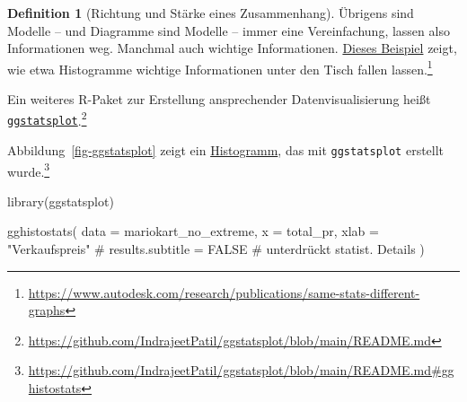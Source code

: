 \documentclass[
  a4paper,
  DIV=11]{scrreprt}
\newenvironment{Shaded}{\begin{snugshade}}{\end{snugshade}}
\newcommand{\AttributeTok}[1]{\textcolor[rgb]{0.40,0.45,0.13}{#1}}
\newcommand{\CommentTok}[1]{\textcolor[rgb]{0.37,0.37,0.37}{#1}}
\newcommand{\FunctionTok}[1]{\textcolor[rgb]{0.28,0.35,0.67}{#1}}
\newcommand{\NormalTok}[1]{\textcolor[rgb]{0.00,0.23,0.31}{#1}}
\newcommand{\StringTok}[1]{\textcolor[rgb]{0.13,0.47,0.30}{#1}}
\theoremstyle{definition}
\theoremstyle{definition}
\theoremstyle{definition}
\newtheorem{definition}{Definition}[chapter]
\theoremstyle{remark}
\begin{document}
\begin{definition}[Richtung und Stärke eines
Zusammenhang]
Übrigens sind Modelle -- und Diagramme sind Modelle -- immer eine
Vereinfachung, lassen also Informationen weg. Manchmal auch wichtige
Informationen.
\href{https://www.autodesk.com/research/publications/same-stats-different-graphs}{Dieses
Beispiel} zeigt, wie etwa Histogramme wichtige Informationen unter den
Tisch fallen lassen.\footnote{\url{https://www.autodesk.com/research/publications/same-stats-different-graphs}}

Ein weiteres R-Paket zur Erstellung ansprechender Datenvisualisierung
heißt
\href{https://github.com/IndrajeetPatil/ggstatsplot/blob/main/README.md}{\texttt{ggstatsplot}}.\footnote{\url{https://github.com/IndrajeetPatil/ggstatsplot/blob/main/README.md}}

Abbildung~\ref{fig-ggstatsplot} zeigt ein
\href{https://github.com/IndrajeetPatil/ggstatsplot/blob/main/README.md\#gghistostats}{Histogramm},
das mit \texttt{ggstatsplot} erstellt wurde.\footnote{\url{https://github.com/IndrajeetPatil/ggstatsplot/blob/main/README.md\#gghistostats}}

\begin{Shaded}
\begin{Highlighting}[]
\FunctionTok{library}\NormalTok{(ggstatsplot)}

\FunctionTok{gghistostats}\NormalTok{(}
  \AttributeTok{data       =}\NormalTok{ mariokart\_no\_extreme,}
  \AttributeTok{x          =}\NormalTok{ total\_pr,}
  \AttributeTok{xlab       =} \StringTok{"Verkaufspreis"} 
  \CommentTok{\# results.subtitle = FALSE   \# unterdrückt statist. Details}
\NormalTok{)}
\end{Highlighting}
\end{Shaded}

\begin{figure}[H]

\end{figure}
\end{definition}
\end{document}
